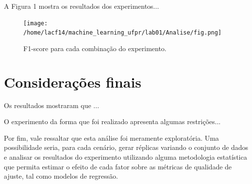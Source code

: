 \documentclass[
	12pt,				%
	openright,			%
	twoside,			%
	a4paper,			%
	english,			%
	brazil,				%
	svgnames
	]{abntex2}\usepackage[]{graphicx}\usepackage[]{color}
\begin{document}

A Figura 1 mostra os resultados dos experimentos... 

\begin{landscape}

\begin{figure}[]
\label{fig:fig1}
\centering
\texttt{[image: /home/lacf14/machine\_learning\_ufpr/lab01/Analise/fig.png]}
\caption{F1-score para cada combinação do experimento.}
\end{figure}
\end{landscape}

\chapter{Considerações finais}
\label{cap:conclusao}


Os resultados mostraram que ... 

O experimento da forma que foi realizado apresenta algumas restrições...



Por fim, vale ressaltar que esta análise foi meramente exploratória. Uma possibilidade seria, para cada cenário, gerar réplicas variando o conjunto de dados e analisar os resultados do experimento utilizando alguma metodologia estatística que permita estimar o efeito de cada fator sobre as métricas de qualidade de ajuste, tal como modelos de regressão.



\postextual




% 
\end{document}
